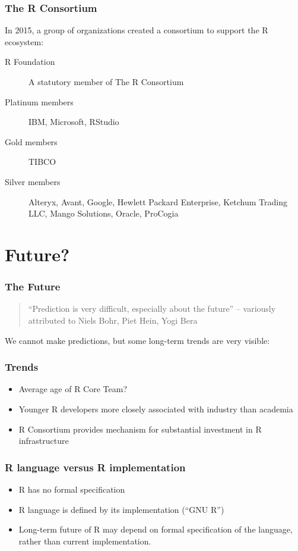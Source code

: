 \documentclass[svgnames]{beamer}
\begin{document}
\begin{frame}
  \frametitle{The R Consortium}

  In 2015, a group of organizations created a consortium to support
  the R ecosystem:
  \begin{description}
  \item [R Foundation] A statutory member of The R Consortium
  \item[Platinum members] IBM, Microsoft, RStudio
  \item[Gold members] TIBCO
  \item[Silver members] Alteryx, Avant, Google, Hewlett Packard
    Enterprise, Ketchum Trading LLC, Mango Solutions, Oracle, ProCogia
  \end{description}
  
\end{frame}

\section{Future?}

\begin{frame}
  \frametitle{The Future}

  \begin{quote}
    ``Prediction is very difficult, especially about the future''
    -- variously attributed to Niels Bohr, Piet Hein, Yogi Bera
  \end{quote}

\end{frame}
    
\begin{frame}
  We cannot make predictions, but some long-term trends are very visible:
  \frametitle{Trends}
  \begin{itemize}
  \item Average age of R Core Team?
  \item Younger R developers more closely associated with industry
    than academia
  \item R Consortium provides mechanism for substantial investment in
    R infrastructure
  \end{itemize}
\end{frame}

\begin{frame}
  \frametitle{R language versus R implementation}

  \begin{itemize}
  \item R has no formal specification
  \item R language is defined by its implementation (``GNU R'')
  \item Long-term future of R may depend on formal specification of
    the language, rather than current implementation.
  \end{itemize}

\end{frame}
\end{document}
